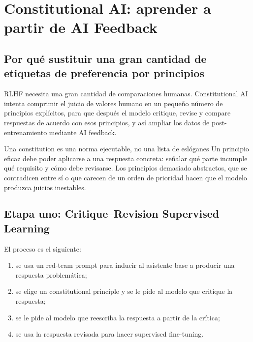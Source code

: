 \section{Constitutional AI: aprender a partir de AI Feedback}

\subsection{Por qué sustituir una gran cantidad de etiquetas de preferencia por principios}

RLHF necesita una gran cantidad de comparaciones humanas. Constitutional AI intenta comprimir el juicio de valores humano en un pequeño número de principios explícitos, para que después el modelo critique, revise y compare respuestas de acuerdo con esos principios, y así ampliar los datos de post-entrenamiento mediante AI feedback.


\begin{knowledgebox}{Una constitution es una norma ejecutable, no una lista de eslóganes}
Un principio eficaz debe poder aplicarse a una respuesta concreta: señalar qué parte incumple qué requisito y cómo debe revisarse. Los principios demasiado abstractos, que se contradicen entre sí o que carecen de un orden de prioridad hacen que el modelo produzca juicios inestables.
\end{knowledgebox}

\subsection{Etapa uno: Critique--Revision Supervised Learning}

El proceso es el siguiente:

\begin{enumerate}
    \item se usa un red-team prompt para inducir al asistente base a producir una respuesta problemática;
    \item se elige un constitutional principle y se le pide al modelo que critique la respuesta;
    \item se le pide al modelo que reescriba la respuesta a partir de la crítica;
    \item se usa la respuesta revisada para hacer supervised fine-tuning.
\end{enumerate}

